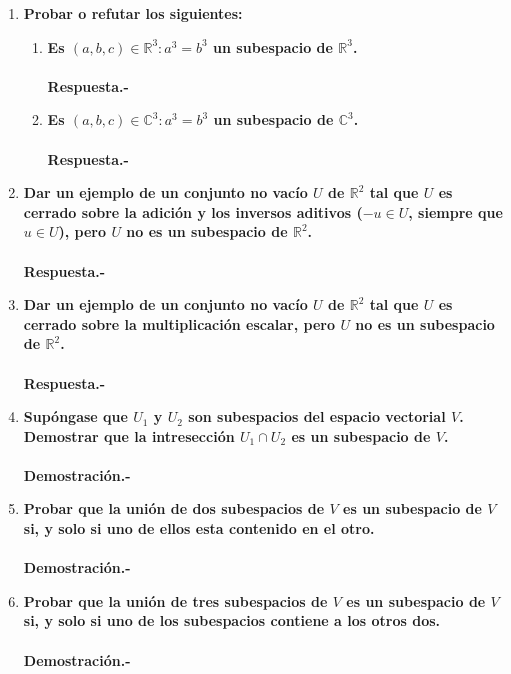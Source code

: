 \begin{multicols}{2}
\begin{enumerate}
    \item \textbf{\boldmath Probar o refutar los siguientes:}

	\begin{enumerate}[\bfseries a)]

	    \item \textbf{\boldmath Es ${(a,b,c)\in \mathbb{R}^3:a^3=b^3}$ un subespacio de $\mathbb{R}^3$.}\\\\
		\textbf{Respuesta.-}\; 

	    \item \textbf{\boldmath Es ${(a,b,c)\in \mathbb{C}^3:a^3=b^3}$ un subespacio de $\mathbb{C}^3$.}\\\\
		\textbf{Respuesta.-}\; 

	\end{enumerate}

    \item \textbf{\boldmath Dar un ejemplo de un conjunto no vacío $U$ de $\mathbb{R}^2$ tal que $U$ es cerrado sobre la adición y los inversos aditivos ($-u\in U$, siempre que $u\in U$), pero $U$ no es un subespacio de $\mathbb{R}^2$.}\\\\
	\textbf{Respuesta.-}\;

    \item \textbf{\boldmath Dar un ejemplo de un conjunto no vacío $U$ de $\mathbb{R}^2$  tal que $U$ es cerrado sobre la multiplicación escalar, pero $U$ no es un subespacio de $\mathbb{R}^2$.}\\\\
	\textbf{Respuesta.-}\;

    \item \textbf{\boldmath Supóngase que $U_1$ y $U_2$ son subespacios del espacio vectorial $V$. Demostrar que la intresección $U_1 \cap U_2$ es un subespacio de $V$.}\\\\ 
	\textbf{Demostración.-}\;

    \item \textbf{\boldmath Probar que la unión de dos subespacios de $V$ es un subespacio de $V$ si, y solo si uno de ellos esta contenido en el otro.}\\\\
	\textbf{Demostración.-}\;

    \item \textbf{\boldmath Probar que la unión de tres subespacios de $V$ es un subespacio de $V$ si, y solo si uno de los subespacios contiene a los otros dos.}\\\\
	\textbf{Demostración.-}\;


\end{enumerate}
\end{multicols}
